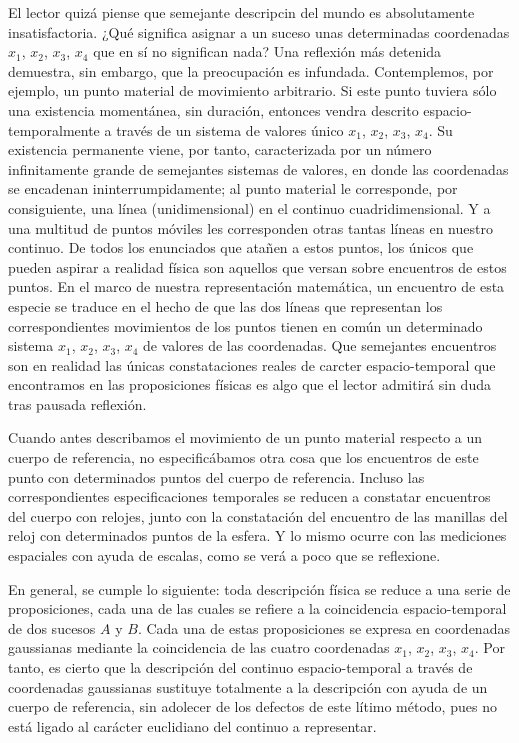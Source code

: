 \documentclass[spanish]{book}
\begin{document}
El lector quizá piense que semejante descripcin del mundo es absolutamente
insatisfactoria. ¿Qué significa asignar a un suceso unas determinadas coordenadas $x_{1}$, $x_{2}$,
$x_{3}$, $x_{4}$ que en sí no significan nada? Una reflexión más detenida demuestra, sin
embargo, que la preocupación es infundada. Contemplemos, por ejemplo, un punto
material de movimiento arbitrario. Si este punto tuviera sólo una existencia
momentánea, sin duración, entonces vendra descrito espacio-temporalmente a través
de un sistema de valores único $x_{1}$, $x_{2}$, $x_{3}$, $x_{4}$. Su existencia permanente viene, por
tanto, caracterizada por un número infinitamente grande de semejantes sistemas de
valores, en donde las coordenadas se encadenan ininterrumpidamente; al punto
material le corresponde, por consiguiente, una línea (unidimensional) en el continuo
cuadridimensional. Y a una multitud de puntos móviles les corresponden otras tantas
líneas en nuestro continuo. De todos los enunciados que atañen a estos puntos, los
únicos que pueden aspirar a realidad física son aquellos que versan sobre encuentros
de estos puntos. En el marco de nuestra representación matemática, un encuentro de
esta especie se traduce en el hecho de que las dos líneas que representan los correspondientes
movimientos de los puntos tienen en común un determinado sistema $x_{1}$, $x_{2}$, $x_{3}$, $x_{4}$
de valores de las coordenadas. Que semejantes encuentros son en realidad las
únicas constataciones reales de carcter espacio-temporal que encontramos en las
proposiciones físicas es algo que el lector admitirá sin duda tras pausada reflexión.

Cuando antes describamos el movimiento de un punto material respecto a un
cuerpo de referencia, no especificábamos otra cosa que los encuentros de este punto
con determinados puntos del cuerpo de referencia. Incluso las correspondientes
especificaciones temporales se reducen a constatar encuentros del cuerpo con relojes,
junto con la constatación del encuentro de las manillas del reloj con determinados
puntos de la esfera. Y lo mismo ocurre con las mediciones espaciales con ayuda de
escalas, como se verá a poco que se reflexione.

En general, se cumple lo siguiente: toda descripción física se reduce a una serie de
proposiciones, cada una de las cuales se refiere a la coincidencia espacio-temporal de
dos sucesos $A$ y $B$. Cada una de estas proposiciones se expresa en coordenadas
gaussianas mediante la coincidencia de las cuatro coordenadas $x_{1}$, $x_{2}$, $x_{3}$,
$x_{4}$. Por tanto, es cierto que la descripción del continuo espacio-temporal a través de coordenadas
gaussianas sustituye totalmente a la descripción con ayuda de un cuerpo de referencia,
sin adolecer de los defectos de este lítimo método, pues no está ligado al carácter
euclidiano del continuo a representar.
\end{document}
